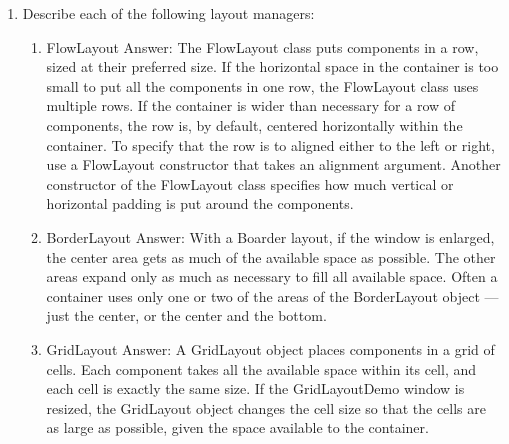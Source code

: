 \documentclass[11pt]{article}
\newenvironment{answer}{\large\lstset{basicstyle=\large\ttfamily}\color{white} \small{Answer:}}{}
\newenvironment{answer}{\large\lstset{basicstyle=\large\ttfamily}\color{red} \small{Answer:}}{}
\begin{document}
\begin{enumerate}
\item Describe each of the following layout managers:
\begin{enumerate}
\item FlowLayout
\begin{answer}
The FlowLayout class puts components in a row, sized at their preferred size. If the horizontal space in the container is too small to put all the components in one row, the FlowLayout class uses multiple rows. If the container is wider than necessary for a row of components, the row is, by default, centered horizontally within the container. To specify that the row is to aligned either to the left or right, use a FlowLayout constructor that takes an alignment argument. Another constructor of the FlowLayout class specifies how much vertical or horizontal padding is put around the components. \end{answer}
\item BorderLayout
\begin{answer}
With a Boarder layout, if the window is enlarged, the center area gets as much of the available space as possible. The other areas expand only as much as necessary to fill all available space. Often a container uses only one or two of the areas of the BorderLayout object — just the center, or the center and the bottom. \end{answer}
\item GridLayout
\begin{answer}
A GridLayout object places components in a grid of cells. Each component takes all the available space within its cell, and each cell is exactly the same size. If the GridLayoutDemo window is resized, the GridLayout object changes the cell size so that the cells are as large as possible, given the space available to the container.\end{answer}
\end{enumerate}





\end{enumerate}
\end{document}
